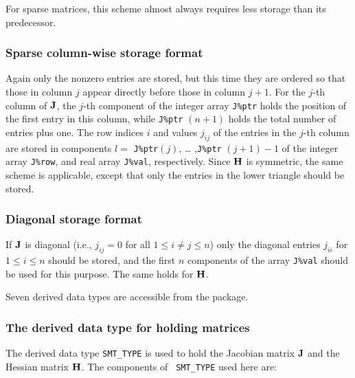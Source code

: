 \documentclass{galahad}
\begin{document}
For sparse matrices, this scheme almost always requires less storage than 
its predecessor.

\subsubsection{Sparse column-wise storage format}\label{columnwise}
Again only the nonzero entries are stored, but this time they are
ordered so that those in column $j$ appear directly before those in column
$j+1$. For the $j$-th column of ${\mathbf{J}}$, the $j$-th component of the integer
array {\tt J\%ptr} holds the position of the first entry in this column,
while {\tt J\%ptr} $(n+1)$ holds the total number of entries plus one.
The row indices $i$ and values $j_{ij}$ of the entries in the
$j$-th column are stored in components $l =$ {\tt J\%ptr}$(j)$, \ldots
,{\tt J\%ptr} $(j+1)-1$ of the integer array {\tt J\%row}, and real
array {\tt J\%val}, respectively.  Since ${\mathbf{H}}$ is symmetric, the same
scheme is applicable, except that only the entries in the lower
triangle should be stored.

\subsubsection{Diagonal storage format}\label{diagonal}
If ${\mathbf{J}}$ is diagonal (i.e., $j_{ij} = 0$ for all $1 \leq i \neq j
\leq n$) only the diagonal entries $j_{ii}$ for $1 \leq i \leq n$ should
be stored, and the first $n$ components of the array {\tt J\%val}
should be used for this purpose.  The same holds for ${\mathbf{H}}$.





\galtypes
Seven derived data types are accessible from the package.


\subsubsection{The derived data type for holding matrices}\label{typesmt}
The derived data type {\tt SMT\_TYPE} is used to hold the Jacobian
matrix ${\mathbf{J}}$ and the Hessian matrix ${\mathbf{H}}$. The components of {\tt
  SMT\_TYPE} used here are:
\end{document}
